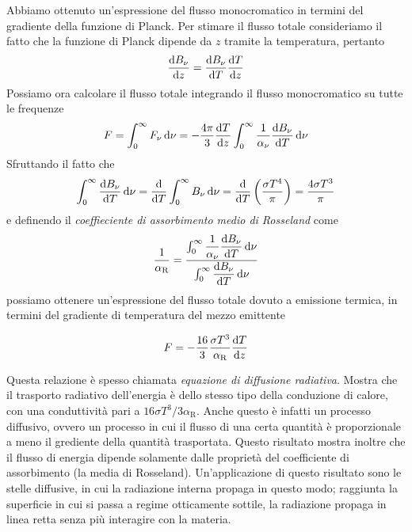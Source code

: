 Abbiamo ottenuto un'espressione del flusso monocromatico in termini del gradiente della funzione di Planck. Per stimare il flusso totale consideriamo il fatto che la funzione di Planck dipende da $z$ tramite la temperatura, pertanto
\begin{equation}
\dfrac{\mathrm{d} {B_\nu}}{\mathrm{d} {z}} = \dfrac{\mathrm{d} {B_\nu}}{\mathrm{d} {T}}\dfrac{\mathrm{d} {T}}{\mathrm{d} {z}}
\end{equation}
Possiamo ora calcolare il flusso totale integrando il flusso monocromatico su tutte le frequenze
\begin{equation}
F = \int_0^\infty F_\nu \, \mathrm{d} \nu = -\dfrac{4\pi}{3} \dfrac{\mathrm{d} {T}}{\mathrm{d} {z}} \int_0^\infty \dfrac{1}{\alpha_\nu} \dfrac{\mathrm{d} {B_\nu}}{\mathrm{d} {T}}\, \mathrm{d} \nu
\end{equation}
Sfruttando il fatto che 
\begin{equation}
\int_0^\infty \dfrac{\mathrm{d} {B_\nu}}{\mathrm{d} {T}}\, \mathrm{d} \nu = \dfrac{\mathrm{d} {}}{\mathrm{d} {T}} \int_0^\infty B_\nu\, \mathrm{d} \nu = \dfrac{\mathrm{d} {}}{\mathrm{d} {T}} \left(\dfrac{\sigma T^4}{\pi} \right) = \dfrac{4\sigma T^3}{\pi}
\end{equation}
e definendo il \textit{coeffieciente di assorbimento medio di Rosseland} come 
\begin{equation}
\dfrac{1}{\alpha_\mathrm{R}} = \dfrac{\int_0^\infty \dfrac{1}{\alpha_\nu} \dfrac{\mathrm{d} {B_\nu}}{\mathrm{d} {T}}\, \mathrm{d} \nu}{\int_0^\infty  \dfrac{\mathrm{d} {B_\nu}}{\mathrm{d} {T}}\, \mathrm{d} \nu}
\end{equation}
possiamo ottenere un'espressione del flusso totale dovuto a emissione termica, in termini del gradiente di temperatura del mezzo emittente
\begin{EQ}
\begin{equation}
F=-\dfrac{16}{3} \dfrac{\sigma T^3}{\alpha_\mathrm{R}} \dfrac{\mathrm{d} {T}}{\mathrm{d} {z}} \label{eq:Rosseland1}
\end{equation}
\end{EQ}
Questa relazione è spesso chiamata \textit{equazione di diffusione radiativa}. Mostra che il trasporto radiativo dell'energia è dello stesso tipo della conduzione di calore, con una conduttività pari a $16\sigma T^3 / 3\alpha_\mathrm{R}$. Anche questo è infatti un processo diffusivo, ovvero un processo in cui il flusso di una certa quantità è proporzionale a meno il grediente della quantità trasportata. Questo risultato mostra inoltre che il flusso di energia dipende solamente dalle proprietà del coefficiente di assorbimento (la media di Rosseland). Un'applicazione di questo risultato sono le stelle diffusive, in cui la radiazione interna propaga in questo modo; raggiunta la superficie in cui si passa a regime otticamente sottile, la radiazione propaga in linea retta senza più interagire con la materia.

